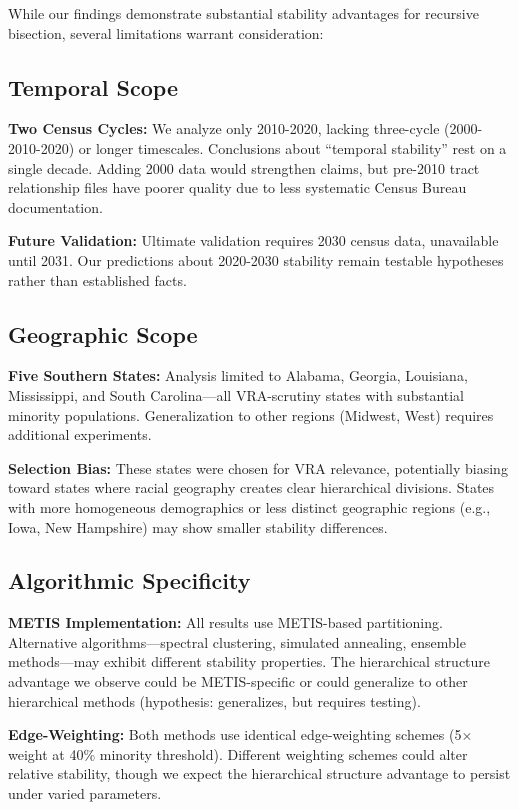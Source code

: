 While our findings demonstrate substantial stability advantages for recursive bisection, several limitations warrant consideration:

\subsection{Temporal Scope}

\textbf{Two Census Cycles:} We analyze only 2010-2020, lacking three-cycle (2000-2010-2020) or longer timescales. Conclusions about ``temporal stability'' rest on a single decade. Adding 2000 data would strengthen claims, but pre-2010 tract relationship files have poorer quality due to less systematic Census Bureau documentation.

\textbf{Future Validation:} Ultimate validation requires 2030 census data, unavailable until 2031. Our predictions about 2020-2030 stability remain testable hypotheses rather than established facts.

\subsection{Geographic Scope}

\textbf{Five Southern States:} Analysis limited to Alabama, Georgia, Louisiana, Mississippi, and South Carolina—all VRA-scrutiny states with substantial minority populations. Generalization to other regions (Midwest, West) requires additional experiments.

\textbf{Selection Bias:} These states were chosen for VRA relevance, potentially biasing toward states where racial geography creates clear hierarchical divisions. States with more homogeneous demographics or less distinct geographic regions (e.g., Iowa, New Hampshire) may show smaller stability differences.

\subsection{Algorithmic Specificity}

\textbf{METIS Implementation:} All results use METIS-based partitioning. Alternative algorithms—spectral clustering, simulated annealing, ensemble methods—may exhibit different stability properties. The hierarchical structure advantage we observe could be METIS-specific or could generalize to other hierarchical methods (hypothesis: generalizes, but requires testing).

\textbf{Edge-Weighting:} Both methods use identical edge-weighting schemes (5$\times$ weight at 40\% minority threshold). Different weighting schemes could alter relative stability, though we expect the hierarchical structure advantage to persist under varied parameters.


